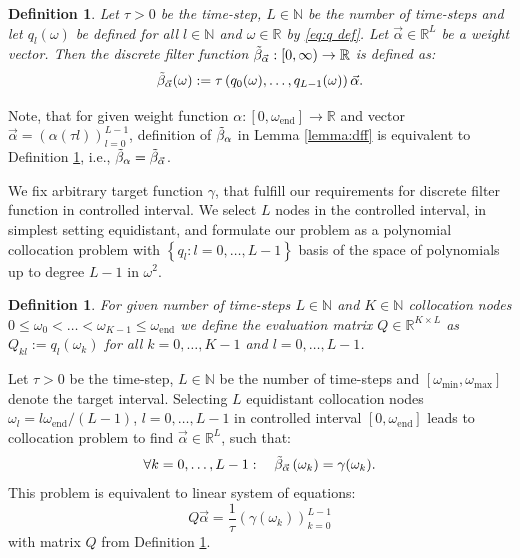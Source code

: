 \documentclass[a4paper,11pt,bibliography=totoc,listof=totoc,headinclude=true,cleardoublepage=empty,oneside]{scrbook}
\newtheorem{definition}[theorem]{Definition}
\newcommand{\R}{\mathbb{R}}
\newcommand{\N}{\mathbb{N}}
\newcommand{\dff}{\Tilde{\beta}_\alpha}
\newcommand{\dffv}{\Tilde{\beta}_{\Vec{\alpha}}}
\newcommand{\e}{\mathrm{end}}
\begin{document}
\begin{definition}\label{def:dffv}
    Let $\tau > 0$ be the time-step, $L\in \N$ be the number of time-steps and let $q_l(\omega)$ be defined for all $l \in \N$ and $\omega \in \R$ by \eqref{eq:q def}. Let $\Vec{\alpha}\in\R^L$ be a weight vector. Then the discrete filter function $\dffv: [0, \infty) \rightarrow \R$ is defined as:
    \begin{equation}\label{eq:dffv}
        \dffv (\omega) := \tau \left(q_0(\omega), \dots, q_{L-1}(\omega)\right) \Vec{\alpha}. 
    \end{equation}
\end{definition}

Note, that for given weight function $\alpha: \left[0, \omega_\e\right] \rightarrow \R$ and vector $\Vec{\alpha} = \left(\alpha(\tau l)\right)_{l=0}^{L-1}$, definition of $\dff$ in Lemma \ref{lemma:dff} is equivalent to Definition \ref{def:dffv}, i.e., $\dff = \dffv$. 

We fix arbitrary target function $\gamma$, that fulfill our requirements for discrete filter function in controlled interval. We select $L$ nodes in the controlled interval, in simplest setting equidistant, and formulate our problem as a polynomial collocation problem with $\left\{q_l : l=0, \dots, L-1\right\}$ basis of the space of polynomials up to degree $L-1$ in $\omega^2$.
\begin{definition}\label{def:evaluation matrix}
    For given number of time-steps $L\in \N$ and $K\in \N$ collocation nodes $ 0 \leqslant \omega_0 < \dots < \omega_{K-1} \leqslant \omega_\e$ we define the evaluation matrix $Q \in \R^{K\times L}$ as $Q_{kl} := q_l\left(\omega_k\right)$ for all $k=0, \dots, K-1$ and $l=0, \dots, L-1$. 
\end{definition}

Let $\tau>0$ be the time-step, $L\in \N$ be the number of time-steps and $\left[\omega_{\min}, \omega_{\max}\right]$ denote the target interval. Selecting $L$ equidistant collocation nodes $\omega_l = l\omega_\e/ (L-1)$, $l=0, \dots, L-1$ in controlled interval $\left[0, \omega_{\e}\right]$ leads to collocation problem to find $\Vec{\alpha} \in \R^L$, such that:
\begin{equation*}
    \forall k = 0, \dots, L-1: \quad \dffv\left(\omega_k\right) = \gamma(\omega_k).
\end{equation*}
This problem is equivalent to linear system of equations:
\begin{equation}\label{eq:alpha eq coll}
     Q \Vec{\alpha} = \frac{1}{\tau} \left(\gamma(\omega_k) \right)_{k=0}^{L-1}
\end{equation}
with matrix $Q$ from Definition \ref{def:evaluation matrix}.
\end{document}
